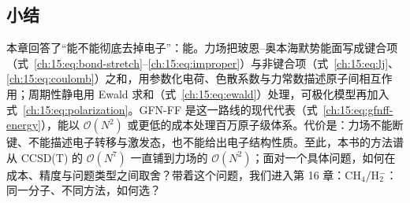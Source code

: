 \subsection*{小结}
本章回答了“能不能彻底去掉电子”：能。力场把玻恩--奥本海默势能面写成键合项（式~\eqref{ch:15:eq:bond-stretch}--\eqref{ch:15:eq:improper}）与非键合项（式~\eqref{ch:15:eq:lj}、\eqref{ch:15:eq:coulomb}）之和，用参数化电荷、色散系数与力常数描述原子间相互作用；周期性静电用 Ewald 求和（式~\eqref{ch:15:eq:ewald}）处理，可极化模型再加入式~\eqref{ch:15:eq:polarization}。GFN-FF 是这一路线的现代代表（式~\eqref{ch:15:eq:gfnff-energy}），能以 $\mathcal{O}(N^2)$ 或更低的成本处理百万原子级体系。代价是：力场不能断键、不能描述电子转移与激发态，也不能给出电子结构性质。至此，本书的方法谱从 CCSD(T) 的 $\mathcal{O}(N^7)$ 一直铺到力场的 $\mathcal{O}(N^2)$；面对一个具体问题，如何在成本、精度与问题类型之间取舍？带着这个问题，我们进入第 16 章：CH$_4$/H$_2^-$：同一分子、不同方法，如何选？
